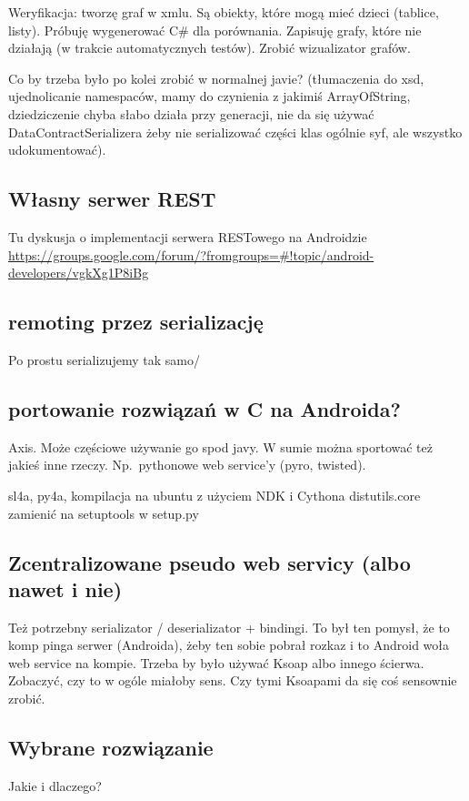 \documentclass[twoside,a4paper]{book}
\begin{document}
Weryfikacja: tworzę graf w xmlu. Są obiekty, które mogą mieć dzieci (tablice, listy). Próbuję wygenerować C\# dla porównania. Zapisuję grafy, które nie działają (w trakcie automatycznych testów). Zrobić wizualizator grafów.

Co by trzeba było po kolei zrobić w normalnej javie? (tłumaczenia do xsd, ujednolicanie namespaców, mamy do czynienia z jakimiś ArrayOfString, dziedziczenie chyba słabo działa przy generacji, nie da się używać DataContractSerializera żeby nie serializować części klas ogólnie syf, ale wszystko udokumentować). 

\subsection{Własny serwer REST}
Tu dyskusja o implementacji serwera RESTowego na Androidzie \url{https://groups.google.com/forum/?fromgroups=#!topic/android-developers/vgkXg1P8iBg}

\subsection{remoting przez serializację}
Po prostu serializujemy tak samo/

\subsection{portowanie rozwiązań w C na Androida?}
Axis. Może częściowe używanie go spod javy. W sumie można sportować też jakieś inne rzeczy. Np.\ pythonowe web service'y (pyro, twisted).

sl4a, py4a, kompilacja na ubuntu z użyciem NDK i Cythona
distutils.core zamienić na setuptools w setup.py

\subsection{Zcentralizowane pseudo web servicy (albo nawet i nie)}
Też potrzebny serializator / deserializator + bindingi. To był ten pomysł, że to komp pinga serwer (Androida), żeby ten sobie pobrał rozkaz i to Android woła web service na kompie. Trzeba by było używać Ksoap albo innego ścierwa. Zobaczyć, czy to w ogóle miałoby sens. Czy tymi Ksoapami da się coś sensownie zrobić.

\subsection{Wybrane rozwiązanie}
Jakie i dlaczego?
\end{document}
